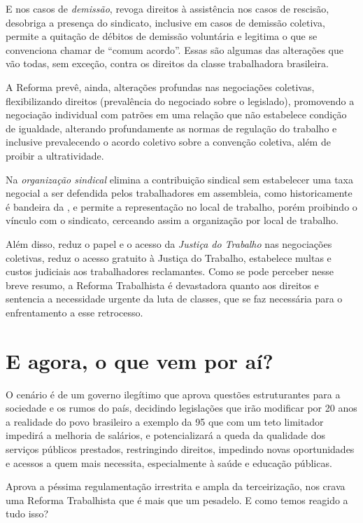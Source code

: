 E nos casos de \emph{demissão}, revoga direitos à assistência nos casos
de rescisão, desobriga a presença do sindicato, inclusive em casos de
demissão coletiva, permite a quitação de débitos de demissão voluntária
e legitima o que se convenciona chamar de ``comum acordo''. Essas são
algumas das alterações que vão todas, sem exceção, contra os direitos da
classe trabalhadora brasileira.

A Reforma prevê, ainda, alterações profundas nas negociações coletivas,
flexibilizando direitos (prevalência do negociado sobre o legislado),
promovendo a negociação individual com patrões em uma relação que não
estabelece condição de igualdade, alterando profundamente as normas de
regulação do trabalho e inclusive prevalecendo o acordo coletivo sobre a
convenção coletiva, além de proibir a ultratividade.

Na \emph{organização sindical} elimina a contribuição sindical sem
estabelecer uma taxa negocial a ser defendida pelos trabalhadores em
assembleia, como historicamente é bandeira da , e permite a
representação no local de trabalho, porém proibindo o vínculo com o
sindicato, cerceando assim a organização por local de trabalho.

Além disso, reduz o papel e o acesso da \emph{Justiça do Trabalho} nas
negociações coletivas, reduz o acesso gratuito à Justiça do Trabalho,
estabelece multas e custos judiciais aos trabalhadores reclamantes. Como
se pode perceber nesse breve resumo, a Reforma Trabalhista é devastadora
quanto aos direitos e sentencia a necessidade urgente da luta de
classes, que se faz necessária para o enfrentamento a esse retrocesso.

\section{E agora, o que vem por aí?}

O cenário é de um governo ilegítimo que aprova questões estruturantes
para a sociedade e os rumos do país, decidindo legislações que irão
modificar por 20 anos a realidade do povo brasileiro a exemplo da  95
que com um teto limitador impedirá a melhoria de salários, e
potencializará a queda da qualidade dos serviços públicos prestados,
restringindo direitos, impedindo novas oportunidades e acessos a quem
mais necessita, especialmente à saúde e educação públicas.

Aprova a péssima regulamentação irrestrita e ampla da terceirização, nos
crava uma Reforma Trabalhista que é mais que um pesadelo. E como temos
reagido a tudo isso?

